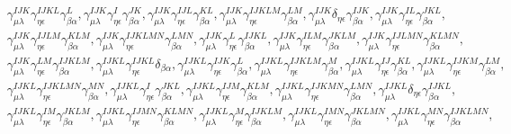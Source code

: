 \documentclass[11pt]{article}
\begin{document}
\begin{small}
\begin{equation}
\begin{split}
    &\quad \gamma _{\mu \lambda }^{IJK}\gamma _{\eta \epsilon }^{IJKL}\gamma _{\beta \alpha }^{L}, \gamma _{\mu \lambda }^{IJK}\gamma _{\eta \epsilon }^{I}\gamma _{\beta \alpha }^{JK}, \gamma _{\mu \lambda }^{IJK}\gamma _{\eta \epsilon }^{IJL}\gamma _{\beta \alpha }^{KL}, \gamma _{\mu \lambda }^{IJK}\gamma _{\eta \epsilon }^{IJKLM}\gamma _{\beta \alpha }^{LM}, \gamma _{\mu \lambda }^{IJK}\delta _{\eta \epsilon }\gamma _{\beta \alpha }^{IJK}, \gamma _{\mu \lambda }^{IJK}\gamma _{\eta \epsilon }^{IL}\gamma _{\beta \alpha }^{JKL},\\
    &\quad \gamma _{\mu \lambda }^{IJK}\gamma _{\eta \epsilon }^{IJLM}\gamma _{\beta \alpha }^{KLM}, \gamma _{\mu \lambda }^{IJK}\gamma _{\eta \epsilon }^{IJKLMN}\gamma _{\beta \alpha }^{LMN}, \gamma _{\mu \lambda }^{IJK}\gamma _{\eta \epsilon }^{L}\gamma _{\beta \alpha }^{IJKL}, \gamma _{\mu \lambda }^{IJK}\gamma _{\eta \epsilon }^{ILM}\gamma _{\beta \alpha }^{JKLM}, \gamma _{\mu \lambda }^{IJK}\gamma _{\eta \epsilon }^{IJLMN}\gamma _{\beta \alpha }^{KLMN},\\
    &\quad \gamma _{\mu \lambda }^{IJK}\gamma _{\eta \epsilon }^{LM}\gamma _{\beta \alpha }^{IJKLM}, \gamma _{\mu \lambda }^{IJKL}\gamma _{\eta \epsilon }^{IJKL}\delta _{\beta \alpha }, \gamma _{\mu \lambda }^{IJKL}\gamma _{\eta \epsilon }^{IJK}\gamma _{\beta \alpha }^{L}, \gamma _{\mu \lambda }^{IJKL}\gamma _{\eta \epsilon }^{IJKLM}\gamma _{\beta \alpha }^{M}, \gamma _{\mu \lambda }^{IJKL}\gamma _{\eta \epsilon }^{IJ}\gamma _{\beta \alpha }^{KL}, \gamma _{\mu \lambda }^{IJKL}\gamma _{\eta \epsilon }^{IJKM}\gamma _{\beta \alpha }^{LM},\\
    &\quad \gamma _{\mu \lambda }^{IJKL}\gamma _{\eta \epsilon }^{IJKLMN}\gamma _{\beta \alpha }^{MN}, \gamma _{\mu \lambda }^{IJKL}\gamma _{\eta \epsilon }^{I}\gamma _{\beta \alpha }^{JKL}, \gamma _{\mu \lambda }^{IJKL}\gamma _{\eta \epsilon }^{IJM}\gamma _{\beta \alpha }^{KLM}, \gamma _{\mu \lambda }^{IJKL}\gamma _{\eta \epsilon }^{IJKMN}\gamma _{\beta \alpha }^{LMN}, \gamma _{\mu \lambda }^{IJKL}\delta _{\eta \epsilon }\gamma _{\beta \alpha }^{IJKL},\\
    &\quad \gamma _{\mu \lambda }^{IJKL}\gamma _{\eta \epsilon }^{IM}\gamma _{\beta \alpha }^{JKLM}, \gamma _{\mu \lambda }^{IJKL}\gamma _{\eta \epsilon }^{IJMN}\gamma _{\beta \alpha }^{KLMN}, \gamma _{\mu \lambda }^{IJKL}\gamma _{\eta \epsilon }^{M}\gamma _{\beta \alpha }^{IJKLM}, \gamma _{\mu \lambda }^{IJKL}\gamma _{\eta \epsilon }^{IMN}\gamma _{\beta \alpha }^{JKLMN}, \gamma _{\mu \lambda }^{IJKL}\gamma _{\eta \epsilon }^{MN}\gamma _{\beta \alpha }^{IJKLMN}, 
\end{split}
\end{equation}
\end{small}
\end{document}
